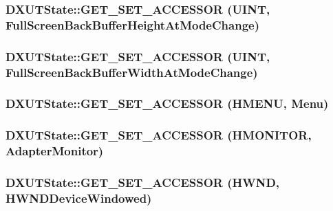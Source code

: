 \label{class_d_x_u_t_state_aa9b801ff918be9e94b0c1b0c495d9988}
\hypertarget{class_d_x_u_t_state_ae5f41b2f4bf62828ee9225bccea71f00}{
\subsubsection[{GET\_\-SET\_\-ACCESSOR}]{\setlength{\rightskip}{0pt plus 5cm}DXUTState::GET\_\-SET\_\-ACCESSOR (UINT, \/  FullScreenBackBufferHeightAtModeChange)}}
\label{class_d_x_u_t_state_ae5f41b2f4bf62828ee9225bccea71f00}
\hypertarget{class_d_x_u_t_state_a40576f264b555cf8e304dd84ffa60091}{
\subsubsection[{GET\_\-SET\_\-ACCESSOR}]{\setlength{\rightskip}{0pt plus 5cm}DXUTState::GET\_\-SET\_\-ACCESSOR (UINT, \/  FullScreenBackBufferWidthAtModeChange)}}
\label{class_d_x_u_t_state_a40576f264b555cf8e304dd84ffa60091}
\hypertarget{class_d_x_u_t_state_a4a8b78386039a9860998de7d43d2e393}{
\subsubsection[{GET\_\-SET\_\-ACCESSOR}]{\setlength{\rightskip}{0pt plus 5cm}DXUTState::GET\_\-SET\_\-ACCESSOR (HMENU, \/  Menu)}}
\label{class_d_x_u_t_state_a4a8b78386039a9860998de7d43d2e393}
\hypertarget{class_d_x_u_t_state_a2efcc409c149447da53fa144e55ec0b2}{
\subsubsection[{GET\_\-SET\_\-ACCESSOR}]{\setlength{\rightskip}{0pt plus 5cm}DXUTState::GET\_\-SET\_\-ACCESSOR (HMONITOR, \/  AdapterMonitor)}}
\label{class_d_x_u_t_state_a2efcc409c149447da53fa144e55ec0b2}
\hypertarget{class_d_x_u_t_state_a5011c6600f15959fd9d4b7be0e44d520}{
\subsubsection[{GET\_\-SET\_\-ACCESSOR}]{\setlength{\rightskip}{0pt plus 5cm}DXUTState::GET\_\-SET\_\-ACCESSOR (HWND, \/  HWNDDeviceWindowed)}}
